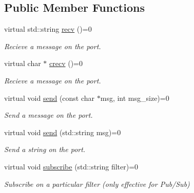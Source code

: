 \subsection*{Public Member Functions}
\begin{DoxyCompactItemize}
\item 
virtual std\+::string \hyperlink{classZmqio_a9365ac0ed42905898502e16857997acc}{recv} ()=0\hypertarget{classZmqio_a9365ac0ed42905898502e16857997acc}{}\label{classZmqio_a9365ac0ed42905898502e16857997acc}

\begin{DoxyCompactList}\small\item\em Recieve a message on the port. \end{DoxyCompactList}\item 
virtual char $\ast$ \hyperlink{classZmqio_ad6bdb5cb90fb279ce9e2aca553c853f9}{crecv} ()=0\hypertarget{classZmqio_ad6bdb5cb90fb279ce9e2aca553c853f9}{}\label{classZmqio_ad6bdb5cb90fb279ce9e2aca553c853f9}

\begin{DoxyCompactList}\small\item\em Recieve a message on the port. \end{DoxyCompactList}\item 
virtual void \hyperlink{classZmqio_a858e00e8ac5c4d1d60c665fa7c0716f0}{send} (const char $\ast$msg, int msg\+\_\+size)=0\hypertarget{classZmqio_a858e00e8ac5c4d1d60c665fa7c0716f0}{}\label{classZmqio_a858e00e8ac5c4d1d60c665fa7c0716f0}

\begin{DoxyCompactList}\small\item\em Send a message on the port. \end{DoxyCompactList}\item 
virtual void \hyperlink{classZmqio_a079f5752b553ddb2e5a2da565bcf162c}{send} (std\+::string msg)=0\hypertarget{classZmqio_a079f5752b553ddb2e5a2da565bcf162c}{}\label{classZmqio_a079f5752b553ddb2e5a2da565bcf162c}

\begin{DoxyCompactList}\small\item\em Send a string on the port. \end{DoxyCompactList}\item 
virtual void \hyperlink{classZmqio_aa315934401c5a3ba2eb502c16a3a6aca}{subscribe} (std\+::string filter)=0\hypertarget{classZmqio_aa315934401c5a3ba2eb502c16a3a6aca}{}\label{classZmqio_aa315934401c5a3ba2eb502c16a3a6aca}

\begin{DoxyCompactList}\small\item\em Subscribe on a particular filter (only effective for Pub/\+Sub) \end{DoxyCompactList}\end{DoxyCompactItemize}


